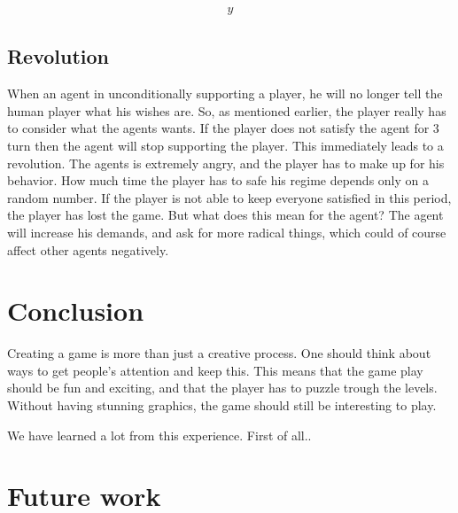 \documentclass[11pt,a4paper]{article}
\begin{document}
\begin{align}
\label{func:pt}
y
\end{align}

\subsection{Revolution}
When an agent in unconditionally supporting a player, he will no longer tell the human player what his wishes are. So, as mentioned earlier, the player really has to consider what the agents wants. If the player does not satisfy the agent for 3 turn then the agent will stop supporting the player. This immediately leads to a revolution. The agents is extremely angry, and the player has to make up for his behavior. How much time the player has to safe his regime depends only on a random number. If the player is not able to keep everyone satisfied in this period, the player has lost the game. But what does this mean for the agent? The agent will increase his demands, and ask for more radical things, which could of course affect other agents negatively. 

\section{Conclusion}
\label{sec:co}
Creating a game is more than just a creative process. One should think about ways to get people's attention and keep this. This means that the game play should be fun and exciting, and that the player has to puzzle trough the levels. Without having stunning graphics, the game should still be interesting to play. 

We have learned a lot from this experience. First of all..

\section{Future work}
\label{sec:fw}
\end{document}
